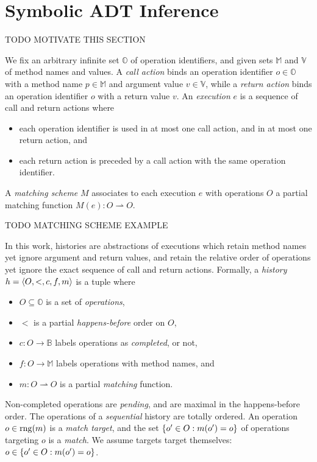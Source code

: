 \section{Symbolic ADT Inference}
\label{sec:inference}

TODO MOTIVATE THIS SECTION

We fix an arbitrary infinite set $\mathbb{O}$ of operation identifiers, and
given sets $\mathbb{M}$ and $\mathbb{V}$ of method names and values. A
\emph{call action} binds an operation identifier $o \in \mathbb{O}$ with a
method name $p \in \mathbb{M}$ and argument value $v \in \mathbb{V}$, while a
\emph{return action} binds an operation identifier $o$ with a return value $v$.
An \emph{execution} $e$ is a sequence of call and return actions where
\begin{itemize}

  \item each operation identifier is used in at most one call action, and in at
  most one return action, and

  \item each return action is preceded by a call action with the same operation
  identifier.

\end{itemize}
A \emph{matching scheme} $M$ associates to each execution $e$ with operations
$O$ a partial matching function $M(e): O \rightharpoonup O$.

\begin{example}

  TODO MATCHING SCHEME EXAMPLE

\end{example}

In this work, histories are abstractions of executions which retain method
names yet ignore argument and return values, and retain the relative order of
operations yet ignore the exact sequence of call and return actions. Formally,
a \emph{history} $h = {\left\langle{O,<,c,f,m}\right\rangle}$ is a tuple where
\begin{itemize}

  \item $O \subseteq \mathbb{O}$ is a set of \emph{operations},

  \item $<$ is a partial \emph{happens-before} order on $O$,

  \item $c: O \to \mathbb{B}$ labels operations as \emph{completed}, or not,

  \item $f: O \to \mathbb{M}$ labels operations with method names, and

  \item $m: O \rightharpoonup O$ is a partial \emph{matching} function.

\end{itemize}
Non-completed operations are \emph{pending}, and are maximal in the
happens-before order. The operations of a \emph{sequential} history are totally
ordered. An operation $o \in \operatorname{rng}(m)$ is a \emph{match target}, and the set
${\{{ o' \in O : m(o') = o}\}}$ of operations targeting $o$ is a \emph{match}. We
assume targets target themselves: $o \in {\{{ o' \in O : m(o') = o}\}}$.


